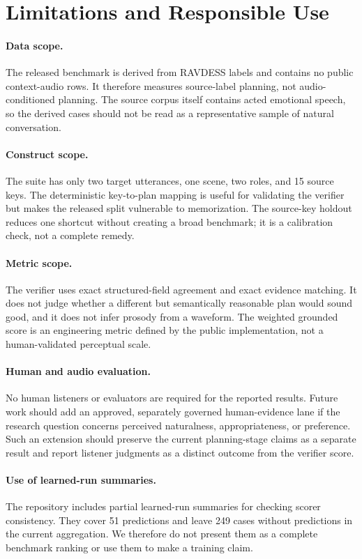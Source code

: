 \documentclass{article}
\begin{document}
\section{Limitations and Responsible Use}

\paragraph{Data scope.}
The released benchmark is derived from RAVDESS labels and contains no public context-audio rows. It therefore measures source-label planning, not audio-conditioned planning. The source corpus itself contains acted emotional speech, so the derived cases should not be read as a representative sample of natural conversation.

\paragraph{Construct scope.}
The suite has only two target utterances, one scene, two roles, and 15 source keys. The deterministic key-to-plan mapping is useful for validating the verifier but makes the released split vulnerable to memorization. The source-key holdout reduces one shortcut without creating a broad benchmark; it is a calibration check, not a complete remedy.

\paragraph{Metric scope.}
The verifier uses exact structured-field agreement and exact evidence matching. It does not judge whether a different but semantically reasonable plan would sound good, and it does not infer prosody from a waveform. The weighted grounded score is an engineering metric defined by the public implementation, not a human-validated perceptual scale.

\paragraph{Human and audio evaluation.}
No human listeners or evaluators are required for the reported results. Future work should add an approved, separately governed human-evidence lane if the research question concerns perceived naturalness, appropriateness, or preference. Such an extension should preserve the current planning-stage claims as a separate result and report listener judgments as a distinct outcome from the verifier score.

\paragraph{Use of learned-run summaries.}
The repository includes partial learned-run summaries for checking scorer consistency. They cover 51 predictions and leave 249 cases without predictions in the current aggregation. We therefore do not present them as a complete benchmark ranking or use them to make a training claim.
\end{document}
